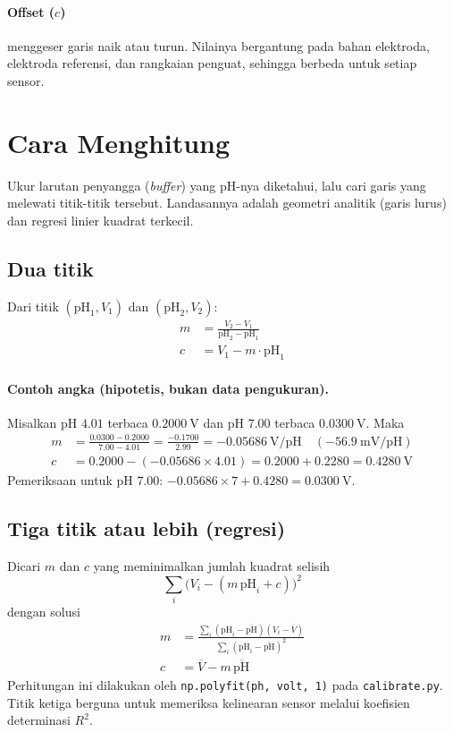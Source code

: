 \documentclass[12pt,a4paper]{article}
\begin{document}
\paragraph{Offset ($c$)} menggeser garis naik atau turun. Nilainya bergantung pada bahan elektroda, elektroda referensi, dan rangkaian penguat, sehingga berbeda untuk setiap sensor.

\section{Cara Menghitung}

Ukur larutan penyangga (\textit{buffer}) yang pH-nya diketahui, lalu cari garis yang melewati titik-titik tersebut. Landasannya adalah geometri analitik (garis lurus) dan regresi linier kuadrat terkecil.

\subsection{Dua titik}

Dari titik $(\text{pH}_1, V_1)$ dan $(\text{pH}_2, V_2)$:
\begin{align}
m &= \frac{V_2 - V_1}{\text{pH}_2 - \text{pH}_1} \label{eq:m2}\\
c &= V_1 - m \cdot \text{pH}_1 \label{eq:c2}
\end{align}

\paragraph{Contoh angka (hipotetis, bukan data pengukuran).}
Misalkan pH $4.01$ terbaca $0.2000\ \text{V}$ dan pH $7.00$ terbaca $0.0300\ \text{V}$. Maka
\begin{align*}
m &= \frac{0.0300 - 0.2000}{7.00 - 4.01} = \frac{-0.1700}{2.99} = -0.05686\ \text{V/pH} \quad (-56.9\ \text{mV/pH})\\
c &= 0.2000 - (-0.05686 \times 4.01) = 0.2000 + 0.2280 = 0.4280\ \text{V}
\end{align*}
Pemeriksaan untuk pH $7.00$: $-0.05686 \times 7 + 0.4280 = 0.0300\ \text{V}$.

\subsection{Tiga titik atau lebih (regresi)}

Dicari $m$ dan $c$ yang meminimalkan jumlah kuadrat selisih
\begin{equation}
\sum_i \bigl(V_i - (m\,\text{pH}_i + c)\bigr)^2
\end{equation}
dengan solusi
\begin{align}
m &= \frac{\sum_i (\text{pH}_i - \overline{\text{pH}})(V_i - \overline{V})}{\sum_i (\text{pH}_i - \overline{\text{pH}})^2} \\
c &= \overline{V} - m\,\overline{\text{pH}}
\end{align}
Perhitungan ini dilakukan oleh \texttt{np.polyfit(ph, volt, 1)} pada \texttt{calibrate.py}. Titik ketiga berguna untuk memeriksa kelinearan sensor melalui koefisien determinasi $R^2$.
\end{document}
